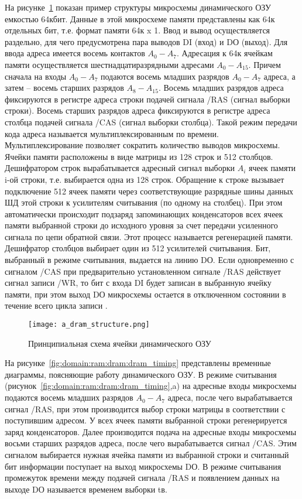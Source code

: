 На рисунке~\ref{fig:domain:ram:dram:dram_structure} показан пример структуры микросхемы динамического ОЗУ емкостью 64кбит. Данные в этой микросхеме памяти представлены как 64к отдельных бит, т.е. формат памяти 64к x 1. Ввод и вывод осуществляется раздельно, для чего предусмотрена пара выводов DI (вход) и DО (выход). Для ввода адреса имеется восемь контактов $A_0 - A_7$. Адресация к 64к ячейкам памяти осуществляется шестнадцатиразрядными адресами $A_0 - A_15$. Причем сначала на входы $A_0 - A_7$ подаются восемь младших разрядов $A_0 - A_7$ адреса, а затем – восемь старших разрядов $A_8 - A_15$. Восемь младших разрядов адреса фиксируются в регистре адреса строки подачей сигнала /RAS (сигнал выборки строки). Восемь старших разрядов адреса фиксируются в регистре адреса столбца подачей сигнала /CAS (сигнал выборки столбца). Такой режим передачи кода адреса называется мультиплексированным по времени. Мультиплексирование позволяет сократить количество выводов микросхемы. Ячейки памяти расположены в виде матрицы из 128 строк и 512 столбцов. Дешифратором строк вырабатывается адресный сигнал выборки $A_i$ ячеек памяти i-ой строки, т.е. выбирается одна из 128 строк. Обращение к строке вызывает подключение 512 ячеек памяти через соответствующие разрядные шины данных ШД этой строки к усилителям считывания (по одному на столбец). При этом автоматически происходит подзаряд запоминающих конденсаторов всех ячеек памяти выбранной строки до исходного уровня за счет передачи усиленного сигнала по цепи обратной связи. Этот процесс называется регенерацией памяти. Дешифратор столбцов выбирает один из 512 усилителей считывания. Бит, выбранный в режиме считывания, выдается на линию DО. Если одновременно с сигналом /CAS при предварительно установленном сигнале /RAS действует сигнал записи /WR, то бит с входа DI будет записан в выбранную ячейку памяти, при этом выход DО микросхемы остается в отключенном состоянии в течение всего цикла записи \cite{dram_tutorial}.

\begin{figure}[ht]
\centering
  \texttt{[image: a\_dram\_structure.png]}  
  \caption{Принципиальная схема ячейки динамического ОЗУ}
  \label{fig:domain:ram:dram:dram_structure}
\end{figure}

На рисунке~\ref{fig:domain:ram:dram:dram_timing} представлены временные диаграммы, поясняющие работу динамического ОЗУ. В режиме считывания (рисунок~\ref{fig:domain:ram:dram:dram_timing},a) на адресные входы микросхемы подаются восемь младших разрядов $A_0 - A_7$ адреса, после чего вырабатывается сигнал /RAS, при этом производится выбор строки матрицы в соответствии с поступившим адресом. У всех ячеек памяти выбранной строки регенерируется заряд конденсаторов. Далее производится подача на адресные входы микросхемы восьми старших разрядов адреса, после чего вырабатывается сигнал /CAS. Этим сигналом выбирается нужная ячейка памяти из выбранной строки и считанный бит информации поступает на выход микросхемы DО. В режиме считывания промежуток времени между подачей сигнала /RAS и появлением данных на выходе DО называется временем выборки tв.

